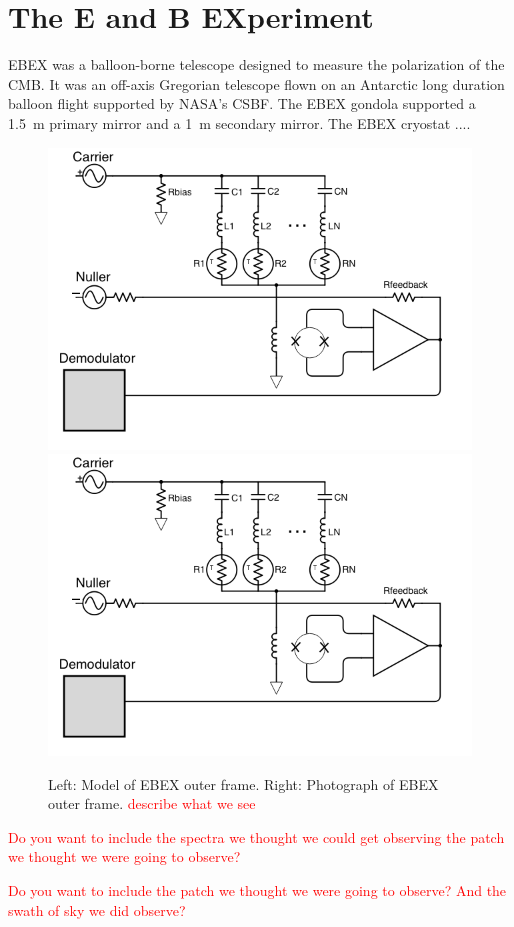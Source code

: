 \section{The E and B EXperiment}
\label{sec:ebex}

\ac{EBEX} was a balloon-borne telescope designed to measure the polarization of the \ac{CMB}.
It was an off-axis Gregorian
 telescope flown on an Antarctic long duration balloon flight supported by \ac{NASA}'s \ac{CSBF}. 
The \ac{EBEX} gondola supported a 1.5~m primary mirror and a 1~m secondary mirror. 
The \ac{EBEX} cryostat ....


\begin{figure}[htbp]
\begin{center}
\includegraphics[width=0.48\columnwidth]{figures/dfmux_schematic.png}
\includegraphics[width=0.48\columnwidth]{figures/dfmux_schematic.png}
\caption[Outer frame, model and photograph]{Left: Model of \ac{EBEX} outer frame. Right: Photograph of \ac{EBEX} outer frame. \textcolor{red}{describe what we see}
\label{fig:gondola} }
\end{center}
\end{figure}

 \textcolor{red}{Do you want to include the spectra we thought we could get observing the patch we thought we were going to observe?}
 
 \textcolor{red}{Do you want to include the patch we thought we were going to observe? And the swath of sky we did observe?}

